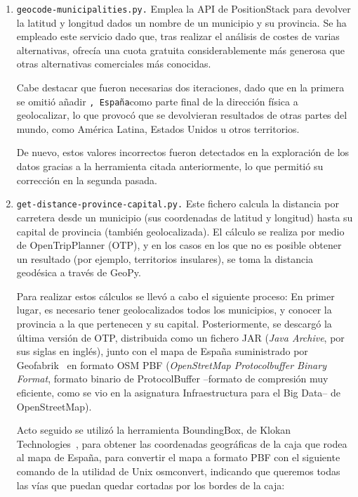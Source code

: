 \begin{enumerate}
    \item \texttt{geocode-municipalities.py.} Emplea la API de PositionStack para devolver la latitud y longitud dados un nombre de un municipio y su provincia. Se ha empleado este servicio dado que, tras realizar el análisis de costes de varias alternativas, ofrecía una cuota gratuita considerablemente más generosa que otras alternativas comerciales más conocidas.
    
    Cabe destacar que fueron necesarias dos iteraciones, dado que en la primera se omitió añadir \guillemotleft\texttt{, España}\guillemotright\space como parte final de la dirección física a geolocalizar, lo que provocó que se devolvieran resultados de otras partes del mundo, como América Latina, Estados Unidos u otros territorios.


    De nuevo, estos valores incorrectos fueron detectados en la exploración de los datos gracias a la herramienta citada anteriormente, lo que permitió su corrección en la segunda pasada.
    
    \item \texttt{get-distance-province-capital.py.} Este fichero calcula la distancia por carretera desde un municipio (sus coordenadas de latitud y longitud) hasta su capital de provincia (también geolocalizada). El cálculo se realiza por medio de OpenTripPlanner (OTP), y en los casos en los que no es posible obtener un resultado (por ejemplo, territorios insulares), se toma la distancia geodésica a través de GeoPy.

    Para realizar estos cálculos se llevó a cabo el siguiente proceso: En primer lugar, es necesario tener geolocalizados todos los municipios, y conocer la provincia a la que pertenecen y su capital. Posteriormente, se descargó la última versión de OTP, distribuida como un fichero JAR (\textit{Java Archive}, por sus siglas en inglés), junto con el mapa de España suministrado por Geofabrik~\cite{spain_map} en formato OSM PBF (\textit{OpenStretMap Protocolbuffer Binary Format}, formato binario de ProtocolBuffer –formato de compresión muy eficiente, como se vio en la asignatura \guillemotleft Infraestructura para el Big Data\guillemotright\space– de OpenStreetMap).

    Acto seguido se utilizó la herramienta BoundingBox, de Klokan Technologies~\cite{klokan}, para obtener las coordenadas geográficas de la caja que rodea al mapa de España, para convertir el mapa a formato PBF con el siguiente comando de la utilidad de Unix osmconvert, indicando que queremos todas las vías que puedan quedar cortadas por los bordes de la caja:


\end{enumerate}
